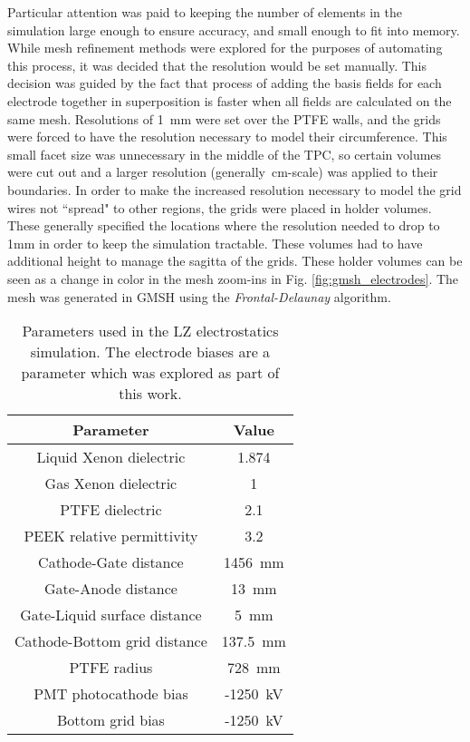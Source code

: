 Particular attention was paid to keeping the number of elements in the simulation large enough to ensure accuracy, and small enough to fit into memory.
While mesh refinement methods were explored for the purposes of automating this process, it was decided that the resolution would be set manually.
This decision was guided by the fact that process of adding the basis fields for each electrode together in superposition is faster when all fields are calculated on the same mesh.
Resolutions of 1~mm were set over the PTFE walls, and the grids were forced to have the resolution necessary to model  their circumference.
This small facet size was unnecessary in the middle of the TPC, so certain volumes were cut out and a larger resolution (generally~cm-scale) was applied to their boundaries.
In order to make the increased resolution necessary to model the grid wires not ``spread" to other regions, the grids were placed in holder volumes.
These generally specified the locations where the resolution needed to drop to 1mm in order to keep the simulation tractable.
These volumes had to have additional height to manage the sagitta of the grids.
These holder volumes can be seen as a change in color in the mesh zoom-ins in Fig. \ref{fig:gmsh_electrodes}.
The mesh was generated in GMSH using the \textit{Frontal-Delaunay} algorithm.


\begin{table}
\centering
\begin{tabular}{|cc|}
\hline
     Parameter & Value \\
     \hline
     Liquid Xenon dielectric & 1.874 \cite{amey_dielectric_1964} \\
     Gas Xenon dielectric & 1 \\
     PTFE dielectric & 2.1 \cite{baker-jarvis_dielectric_2001} \\
     PEEK relative permittivity & 3.2 \cite{noauthor_supplier_2003} \\
     Cathode-Gate distance & 1456~mm \\
     Gate-Anode distance & 13~mm \\
     Gate-Liquid surface distance & 5~mm \\
     Cathode-Bottom grid distance & 137.5~mm \\
     PTFE radius & 728~mm \\
     PMT photocathode bias & -1250~kV \\
     Bottom grid bias & -1250~kV \\
     \hline
\end{tabular}
\caption {Parameters used in the LZ electrostatics simulation. The electrode biases are a parameter which was explored as part of this work.}
\label{tab:efield_params}
\end{table}

